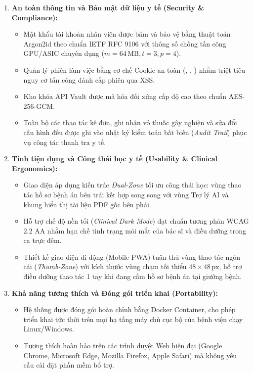 \begin{enumerate}[leftmargin=1.8em]
    \item \textbf{An toàn thông tin và Bảo mật dữ liệu y tế (Security \& Compliance):}
    \begin{itemize}
        \item Mật khẩu tài khoản nhân viên được băm và bảo vệ bằng thuật toán Argon2id theo chuẩn IETF RFC 9106 với thông số chống tấn công GPU/ASIC chuyên dụng ($m = 64\,\text{MB}, t = 3, p = 4$).
        \item Quản lý phiên làm việc bằng cơ chế Cookie an toàn (, , ) nhằm triệt tiêu nguy cơ tấn công đánh cắp phiên qua XSS.
        \item Kho khóa API Vault được mã hóa đối xứng cấp độ cao theo chuẩn AES-256-GCM.
        \item Toàn bộ các thao tác kê đơn, ghi nhận vỏ thuốc gây nghiện và sửa đổi cấu hình đều được ghi vào nhật ký kiểm toán bất biến (\textit{Audit Trail}) phục vụ công tác thanh tra y tế.
    \end{itemize}

    \item \textbf{Tính tiện dụng và Công thái học y tế (Usability \& Clinical Ergonomics):}
    \begin{itemize}
        \item Giao diện áp dụng kiến trúc \textit{Dual-Zone} tối ưu công thái học: vùng thao tác hồ sơ bệnh án bên trái kết hợp song song với vùng Trợ lý AI và khung hiển thị tài liệu PDF gốc bên phải.
        \item Hỗ trợ chế độ nền tối (\textit{Clinical Dark Mode}) đạt chuẩn tương phản WCAG 2.2 AA nhằm hạn chế tình trạng mỏi mắt của bác sĩ và điều dưỡng trong ca trực đêm.
        \item Thiết kế giao diện di động (Mobile PWA) tuân thủ vùng thao tác ngón cái (\textit{Thumb-Zone}) với kích thước vùng chạm tối thiểu $48 \times 48\,\text{px}$, hỗ trợ điều dưỡng thao tác 1 tay khi đang cầm hồ sơ bệnh án tại giường bệnh.
    \end{itemize}

    \item \textbf{Khả năng tương thích và Đóng gói triển khai (Portability):}
    \begin{itemize}
        \item Hệ thống được đóng gói hoàn chỉnh bằng Docker Container, cho phép triển khai tức thời trên mọi hạ tầng máy chủ cục bộ của bệnh viện chạy Linux/Windows.
        \item Tương thích hoàn hảo trên các trình duyệt Web hiện đại (Google Chrome, Microsoft Edge, Mozilla Firefox, Apple Safari) mà không yêu cầu cài đặt phần mềm bổ trợ.
    \end{itemize}
\end{enumerate}

